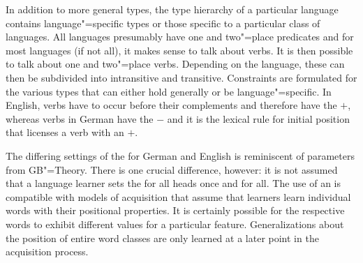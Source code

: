 In addition to more general types, the type hierarchy of a particular language contains language"=specific types or those specific to a particular class
of languages. All languages presumably have one and two"=place predicates and for most languages (if not all), it makes sense to talk about verbs.
It is then possible to talk about one and two"=place verbs. Depending on the language, these can then be subdivided into intransitive and transitive.
Constraints are formulated for the various types that can either hold generally or be language"=specific.
In English, verbs have to occur before their complements and therefore have the
\initialv $+$, whereas verbs in German have the \initialv $-$ and it is the lexical rule for initial
position that licenses a verb with an \initialv $+$.

The differing settings of the \initialv for German and English is reminiscent of
parameters from GB"=Theory. There is one crucial difference,
however: it is not assumed that a language learner sets the \initialv for all
heads once and for all. The use of an \initialv is compatible with models of acquisition that assume that learners
learn individual words with their positional properties. It is certainly possible for the respective
words to exhibit different values for a particular feature. Generalizations about the position of
entire word classes are only learned at a later point in the acquisition process.

